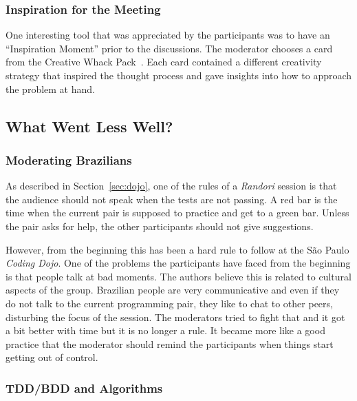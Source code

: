\subsubsection{Inspiration for the Meeting}

One interesting tool that was appreciated by the participants was
to have an ``Inspiration Moment'' prior to the discussions. The moderator
chooses a card from the Creative Whack Pack~\cite{Creative}. Each
card contained a different creativity strategy that inspired the thought
process and gave insights into how to approach the problem at hand.

\subsection{What Went Less Well?}\label{ssub:less_well}

\subsubsection{Moderating Brazilians}

As described in Section~\ref{sec:dojo}, one of the rules of a
\emph{Randori} session is that the audience should not speak when
the tests are not passing. A red bar is the time when the current
pair is supposed to practice and get to a green bar. Unless the pair
asks for help, the other participants should not give suggestions.

However, from the beginning this has been a hard rule to follow at
the São Paulo \emph{Coding Dojo}. One of the problems the participants
have faced from the beginning is that people talk at bad moments. The authors
believe this is related to cultural aspects of the group. Brazilian people are
very communicative and even if they do not talk to the current programming
pair, they like to chat to other peers, disturbing the focus of the session.
The moderators tried to fight that and it got a bit better with time but it is no
longer a rule. It became more like a good practice that the moderator should
remind the participants when things start getting out of control.

\subsubsection{TDD/BDD and Algorithms}

